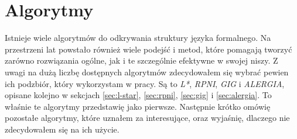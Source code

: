 \chapter{Algorytmy}
\label{cha:algorytmy}

Istnieje wiele algorytmów do odkrywania struktury języka formalnego. Na przestrzeni lat powstało również wiele podejść i metod, które pomagają tworzyć zarówno rozwiązania ogólne, jak i te szczególnie efektywne w swojej niszy. Z uwagi na dużą liczbę dostępnych algorytmów zdecydowałem się wybrać pewien ich podzbiór, który wykorzystam w pracy. Są to \textit{L*}, \textit{RPNI}, \textit{GIG} i \textit{ALERGIA}, opisane kolejno w sekcjach \ref{sec:l-star}, \ref{sec:rpni}, \ref{sec:gig} i \ref{sec:alergia}. To właśnie te algorytmy przedstawię jako pierwsze. Następnie krótko omówię pozostałe algorytmy, które uznałem za interesujące, oraz wyjaśnię, dlaczego nie zdecydowałem się na ich użycie.





